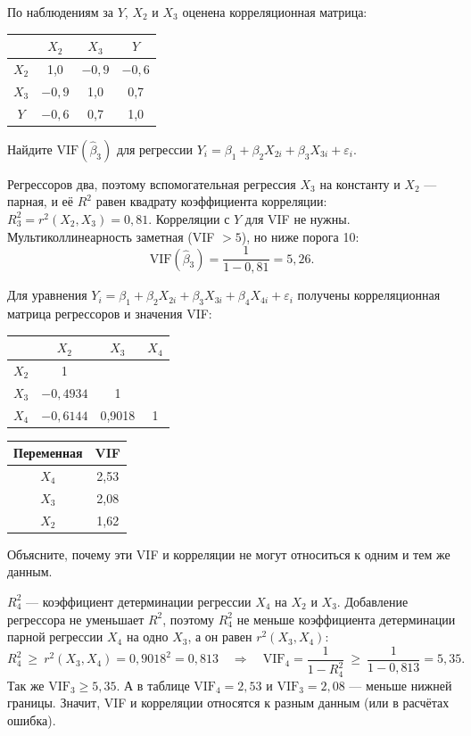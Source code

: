 
По наблюдениям за $Y$, $X_2$ и $X_3$ оценена корреляционная матрица:
\begin{center}
\begin{tabular}{c|ccc}
      & $X_2$  & $X_3$  & $Y$ \\ \hline
$X_2$ & 1,0    & $-0{,}9$ & $-0{,}6$ \\
$X_3$ & $-0{,}9$ & 1,0    & 0,7 \\
$Y$   & $-0{,}6$ & 0,7    & 1,0
\end{tabular}
\end{center}
Найдите $\mathrm{VIF}(\widehat{\beta}_3)$ для регрессии
$Y_i = \beta_1 + \beta_2X_{2i} + \beta_3X_{3i} + \varepsilon_i$.

\begin{solution}
Регрессоров два, поэтому вспомогательная регрессия $X_3$ на константу и $X_2$
— парная, и её $R^2$ равен квадрату коэффициента корреляции:
$R_3^2 = r^2(X_2, X_3) = 0{,}81$. Корреляции с $Y$ для VIF не нужны.
Мультиколлинеарность заметная (VIF $> 5$), но ниже порога 10:
\[
  \mathrm{VIF}(\widehat{\beta}_3) = \frac{1}{1 - 0{,}81} = 5{,}26 .
\]
\end{solution}

\ifsolutions\clearpage\fi
{}

Для уравнения $Y_i = \beta_1 + \beta_2X_{2i} + \beta_3X_{3i} + \beta_4X_{4i} +
\varepsilon_i$ получены корреляционная матрица регрессоров и значения VIF:
\begin{center}
\begin{tabular}{c|ccc}
      & $X_2$ & $X_3$ & $X_4$ \\ \hline
$X_2$ & 1 & & \\
$X_3$ & $-0{,}4934$ & 1 & \\
$X_4$ & $-0{,}6144$ & 0,9018 & 1
\end{tabular}
\qquad
\begin{tabular}{cc}
\toprule
Переменная & VIF \\
\midrule
$X_4$ & 2,53 \\
$X_3$ & 2,08 \\
$X_2$ & 1,62 \\
\bottomrule
\end{tabular}
\end{center}
Объясните, почему эти VIF и корреляции не могут относиться к одним и тем же
данным.

\begin{solution}
$R_4^2$ — коэффициент детерминации регрессии $X_4$ на $X_2$ и $X_3$. Добавление
регрессора не уменьшает $R^2$, поэтому $R_4^2$ не меньше коэффициента
детерминации парной регрессии $X_4$ на одно $X_3$, а он равен
$r^2(X_3, X_4)$:
\[
  R_4^2 \ \ge\ r^2(X_3, X_4) = 0{,}9018^2 = 0{,}813
  \quad\Longrightarrow\quad
  \mathrm{VIF}_4 = \frac{1}{1 - R_4^2} \ \ge\ \frac{1}{1 - 0{,}813} = 5{,}35 .
\]
Так же $\mathrm{VIF}_3 \ge 5{,}35$. А в таблице $\mathrm{VIF}_4 = 2{,}53$ и
$\mathrm{VIF}_3 = 2{,}08$ — меньше нижней границы. Значит, VIF и корреляции
относятся к разным данным (или в расчётах ошибка).
\end{solution}
